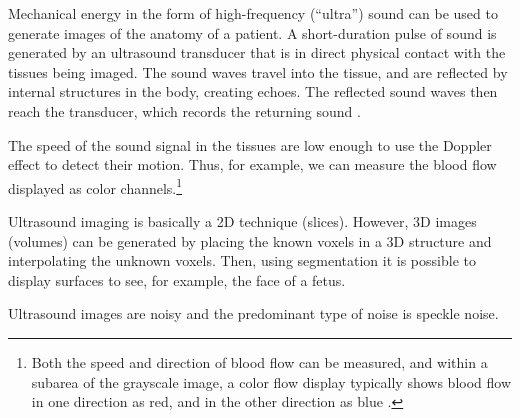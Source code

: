 
Mechanical energy in the form of high-frequency (``ultra'') sound can
be used to generate images of the anatomy of a patient. A
short-duration pulse of sound is generated by an ultrasound transducer
that is in direct physical contact with the tissues being imaged. The
sound waves travel into the tissue, and are reflected by internal
structures in the body, creating echoes. The reflected sound waves
then reach the transducer, which records the returning sound
\cite{bushberg2011essential}.

The speed of the sound signal in the tissues are low enough to use the
Doppler effect to detect their motion. Thus, for example, we can
measure the blood flow displayed as color channels.\footnote{Both the
  speed and direction of blood flow can be measured, and within a
  subarea of the grayscale image, a color flow display typically shows
  blood flow in one direction as red, and in the other direction as
  blue \cite{bushberg2011essential}.}

Ultrasound imaging is basically a 2D technique (slices). However, 3D
images (volumes) can be generated by placing the known voxels in a 3D
structure and interpolating the unknown voxels. Then, using
segmentation it is possible to display surfaces to see, for example,
the face of a fetus.

Ultrasound images are noisy and the predominant type of noise is
speckle noise.
